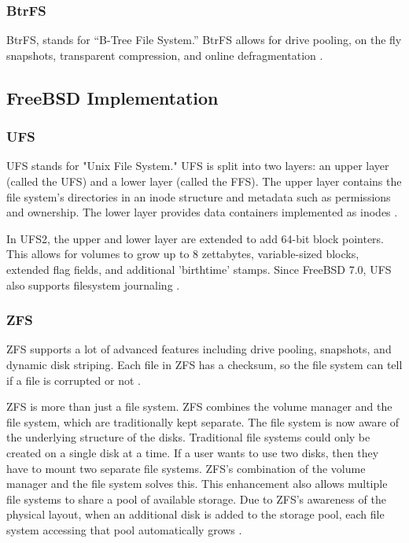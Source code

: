 \documentclass[onecolumn,draftclsnofoot, 10pt, compsoc]{IEEEtran}
\begin{document}
		\subsubsection{BtrFS}
			BtrFS, stands for “B-Tree File System.”
			BtrFS allows for drive pooling, on the fly snapshots, transparent compression, and online defragmentation \cite{llinuxEXT4}.

	\subsection{FreeBSD Implementation}
		\subsubsection{UFS}
			UFS stands for "Unix File System."
			UFS is split into two layers: an upper layer (called the UFS) and a lower layer (called the FFS).
			The upper layer contains the file system's directories in an inode structure and metadata such as permissions and ownership.
			The lower layer provides data containers implemented as inodes \cite{freebsdUFS}.
			
			In UFS2, the upper and lower layer are extended to add 64-bit block pointers.
			This allows for volumes to grow up to 8 zettabytes, variable-sized blocks, extended flag fields, and additional 'birthtime' stamps. 
			Since FreeBSD 7.0, UFS also supports filesystem journaling \cite{freebsdUFS}.
	
		\subsubsection{ZFS}
			ZFS supports a lot of advanced features including drive pooling, snapshots, and dynamic disk striping.
			Each file in ZFS has a checksum, so the file system can tell if a file is corrupted or not \cite{llinuxEXT4}.
			
			ZFS is more than just a file system. 
			ZFS combines the volume manager and the file system, which are traditionally kept separate.
			The file system is now aware of the underlying structure of the disks. 
			Traditional file systems could only be created on a single disk at a time. 
			If a user wants to use two disks, then they have to mount two separate file systems. 
			ZFS's combination of the volume manager and the file system solves this.
			This enhancement also allows multiple file systems to share a pool of available storage. 
			Due to ZFS's awareness of the physical layout, when an additional disk is added to the storage pool, each file system accessing that pool automatically grows \cite{freebsdZFS}.  
\end{document}
